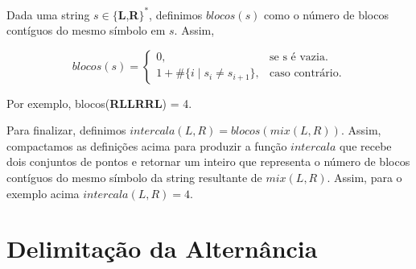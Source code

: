 Dada uma string $s \in \{$\textbf{L},\textbf{R}$\}^{*}$, definimos $blocos(s)$ como o número de blocos contíguos do mesmo símbolo em $s$. Assim,

\[
blocos(s) = 
\begin{cases}
    0, & \text{se s é vazia}. \\
    1 + \#\{i \mid s_i \neq s_{i+1}\}, & \text{caso contrário}.
\end{cases}
\]

Por exemplo, blocos(\textbf{RLLRRL}) = 4.

Para finalizar, definimos $intercala(L,R) = blocos(mix(L,R))$. Assim, compactamos as definições acima para produzir a função $intercala$ que recebe dois conjuntos de pontos e retornar um inteiro que representa o número de blocos contíguos do mesmo símbolo da string resultante de $mix(L,R)$. Assim, para o exemplo acima $intercala(L,R) = 4$.


\section{Delimitação da Alternância}

